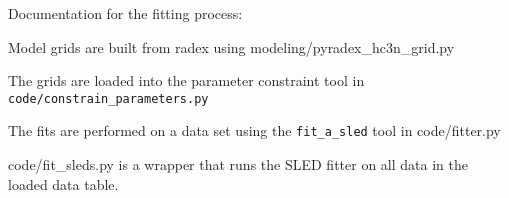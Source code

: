 Documentation for the fitting process:

Model grids are built from radex using modeling/pyradex_hc3n_grid.py

The grids are loaded into the parameter constraint tool in \texttt{code/constrain_parameters.py}

The fits are performed on a data set using the \texttt{fit\_a\_sled} tool in code/fitter.py

code/fit_sleds.py is a wrapper that runs the SLED fitter on all data in the loaded data table.